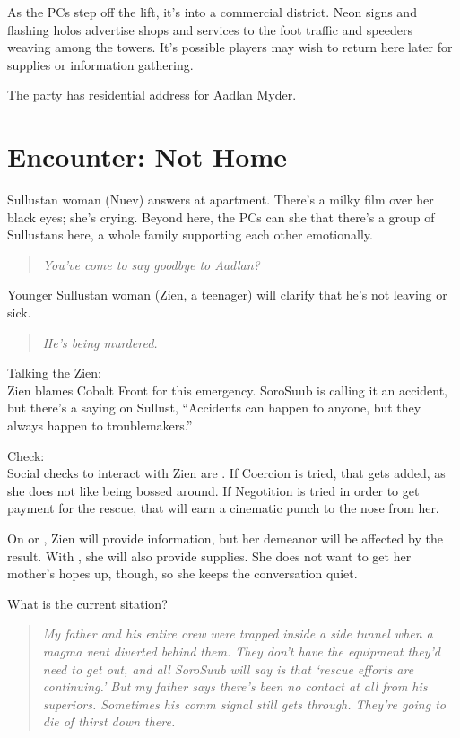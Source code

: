 \documentclass{book}
\begin{document}
\begin{multicols}{2}
As the PCs step off the lift, it’s into a commercial district. Neon signs and flashing holos advertise shops and services to the foot traffic and speeders weaving among the towers. It's possible players may wish to return here later for supplies or information gathering.

The party has residential address for Aadlan Myder.

\section{Encounter: Not Home}

Sullustan woman (Nuev) answers at apartment. There’s a milky film over her black eyes; she’s crying. Beyond here, the PCs can she that there’s a group of Sullustans here, a whole family supporting each other emotionally.
\begin{quote}
\emph{You’ve come to say goodbye to Aadlan? }
\end{quote}

Younger Sullustan woman (Zien, a teenager) will clarify that he’s not leaving or sick.
\begin{quote}
\emph{He’s being murdered.}
\end{quote}

Talking the Zien:\\
Zien blames Cobalt Front for this emergency. SoroSuub is calling it an accident, but there’s a saying on Sullust, “Accidents can happen to anyone, but they always happen to troublemakers.”

Check:\\
Social checks to interact with Zien are \difficult\difficult. If Coercion is tried, that gets \setback added, as she does not like being bossed around. If Negotition is tried in order to get payment for the rescue, that will earn a cinematic punch to the nose from her. 

On \success or \failure, Zien will provide information, but her demeanor will be affected by the result. With \success, she will also provide supplies. She does not want to get her mother's hopes up, though, so she keeps the conversation quiet. 

What is the current sitation?\\
\begin{quote}
\emph{
My father and his entire crew were trapped inside a side tunnel when a magma vent diverted behind them. They don’t have the equipment they’d need to get out, and all SoroSuub will say is that ‘rescue efforts are continuing.’ But my father says there’s been no contact at all from his superiors. Sometimes his comm signal still gets through. They’re going to die of thirst down there.}
\end{quote}


\end{multicols}
\end{document}
